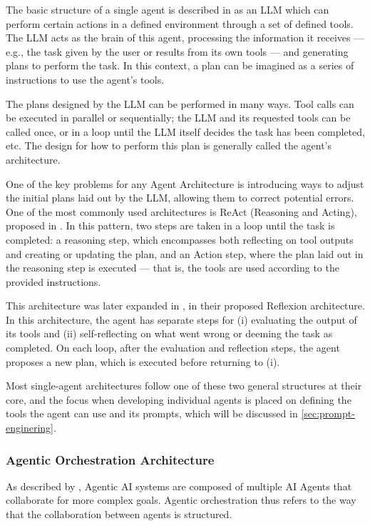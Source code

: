 \documentclass[a4paper]{report}
\begin{document}
The basic structure of a single agent is described in \cite{aiebook2025} as an LLM which can perform certain actions in a defined environment through a set of defined tools. The LLM acts as the brain of this agent, processing the information it receives --- e.g., the task given by the user or results from its own tools --- and generating plans to perform the task. In this context, a plan can be imagined as a series of instructions to use the agent's tools.

The plans designed by the LLM can be performed in many ways. Tool calls can be executed in parallel or sequentially; the LLM and its requested tools can be called once, or in a loop until the LLM itself decides the task has been completed, etc. The design for how to perform this plan is generally called the agent's architecture.

One of the key problems for any Agent Architecture is introducing ways to adjust the initial plans laid out by the LLM, allowing them to correct potential errors. One of the most commonly used architectures is ReAct (Reasoning and Acting), proposed in \cite{yao2023react}. In this pattern, two steps are taken in a loop until the task is completed: a reasoning step, which encompasses both reflecting on tool outputs and creating or updating the plan, and an Action step, where the plan laid out in the reasoning step is executed --- that is, the tools are used according to the provided instructions.

This architecture was later expanded in \cite{shinn2023reflexion}, in their proposed Reflexion architecture. In this architecture, the agent has separate steps for (i) evaluating the output of its tools and (ii) self-reflecting on what went wrong or deeming the task as completed. On each loop, after the evaluation and reflection steps, the agent proposes a new plan, which is executed before returning to (i).

Most single-agent architectures follow one of these two general structures at their core, and the focus when developing individual agents is placed on defining the tools the agent can use and its prompts, which will be discussed in \autoref{sec:prompt-enginering}.

\subsubsection{Agentic Orchestration Architecture}

As described by \cite{sapkota2025aiagentsvsagentic}, Agentic AI systems are composed of multiple AI Agents that collaborate for more complex goals. Agentic orchestration thus refers to the way that the collaboration between agents is structured.
\end{document}
